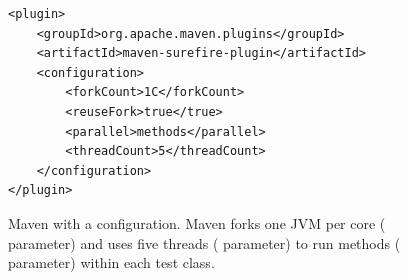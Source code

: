 \begin{figure}[h!]
\centering
\scriptsize
{}
\begin{lstlisting}
<plugin>
    <groupId>org.apache.maven.plugins</groupId>
    <artifactId>maven-surefire-plugin</artifactId>
    <configuration>
        <forkCount>1C</forkCount>
        <reuseFork>true</true>
        <parallel>methods</parallel>
        <threadCount>5</threadCount>
    </configuration>
</plugin>
\end{lstlisting}
    \caption{\label{fig:surefire} Maven with a \ForkParMeth{}
    configuration. Maven forks one JVM per core (
    parameter) and  uses five threads
    ( parameter) to run methods (
    parameter) within each test class.}
    
\end{figure}





